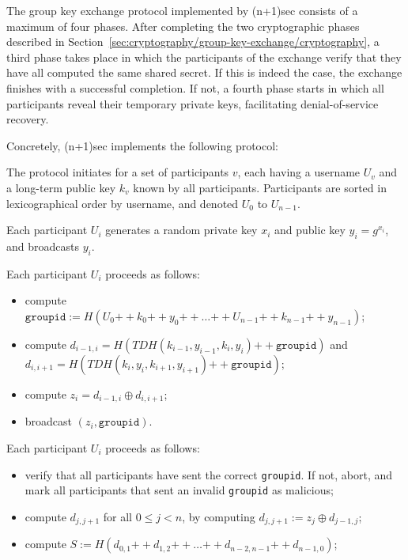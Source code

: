 \documentclass{article}
\def\concat{\mathbin{+\!\!\!+}}
\def\xor{\oplus}
\begin{document}
The group key exchange protocol implemented by (n+1)sec consists of a maximum of four phases.
After completing the two cryptographic phases described in Section~\ref{sec:cryptography/group-key-exchange/cryptography}, a third phase takes place in which the participants of the exchange verify that they have all computed the same shared secret.
If this is indeed the case, the exchange finishes with a successful completion.
If not, a fourth phase starts in which all participants reveal their temporary private keys, facilitating denial-of-service recovery.

Concretely, (n+1)sec implements the following protocol:
\begin{description}[noitemsep]
\item[Participants.] The protocol initiates for a set of participants $v$, each having a username $U_v$ and a long-term public key $k_v$ known by all participants. Participants are sorted in lexicographical order by username, and denoted $U_0$ to $U_{n-1}$.
\item[Round 1.] Each participant $U_i$ generates a random private key $x_i$ and public key $y_i = g^{x_i}$, and broadcasts $y_i$.
\item[Round 2.] Each participant $U_i$ proceeds as follows:
	\begin{itemize}[noitemsep,nolistsep]\renewcommand{\labelitemi}{--}
	\item compute $\texttt{groupid} := H(U_0 \concat k_0 \concat y_0 \concat \ldots \concat U_{n-1} \concat k_{n-1} \concat y_{n-1})$;
	\item compute $d_{i-1, i} = H(TDH(k_{i-1}, y_{i-1}, k_i, y_i) \concat \texttt{groupid})$ and $d_{i, i+1} = H(TDH(k_i, y_i, k_{i+1}, y_{i+1}) \concat \texttt{groupid})$;
	\item compute $z_i = d_{i-1, i} \xor d_{i, i+1}$;
	\item broadcast $(z_i, \texttt{groupid})$.
	\end{itemize}
\item[Round 3.] Each participant $U_i$ proceeds as follows:
	\begin{itemize}[noitemsep,nolistsep]\renewcommand{\labelitemi}{--}
	\item verify that all participants have sent the correct \texttt{groupid}. If not, abort, and mark all participants that sent an invalid \texttt{groupid} as malicious;
	\item compute $d_{j, j+1}$ for all $0 \leq j < n$, by computing $d_{j, j+1} := z_j \xor d_{j-1, j}$;
	\item compute $S := H(d_{0, 1} \concat d_{1, 2} \concat \ldots \concat d_{n-2, n-1} \concat d_{n-1, 0})$;

\end{itemize}
\end{description}
\end{document}
